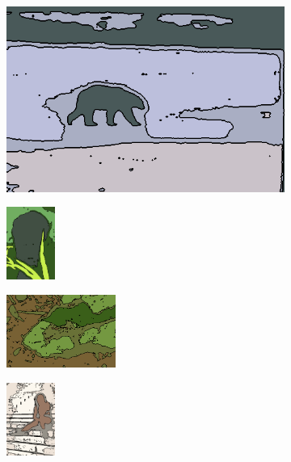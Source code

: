 \documentclass[journal]{IEEEtran}
\begin{document}
\begin{figure}[!ht]
    \begin{subfigure}[t]{\textwidth+20pt\relax}
    	\centering
    	\includegraphics[width=\dimexpr\linewidth-20pt\relax]{100007_GaussianMixture_const_segm} 
    \end{subfigure}      
    \begin{subfigure}[b]{0.23\textwidth}
    	\centering
        \includegraphics[height=67.68857pt]{101084_GaussianMixture_const_segm}
    \end{subfigure}
    \begin{subfigure}[b]{0.23\textwidth}
    	\centering
        \includegraphics[height=67.68857pt]{175083_GaussianMixture_const_segm}
    \end{subfigure}
    \begin{subfigure}[b]{0.23\textwidth}
    	\centering
        \includegraphics[height=67.68857pt]{181021_GaussianMixture_const_segm}
    \end{subfigure} \\ 
    

\end{figure}
\end{document}

